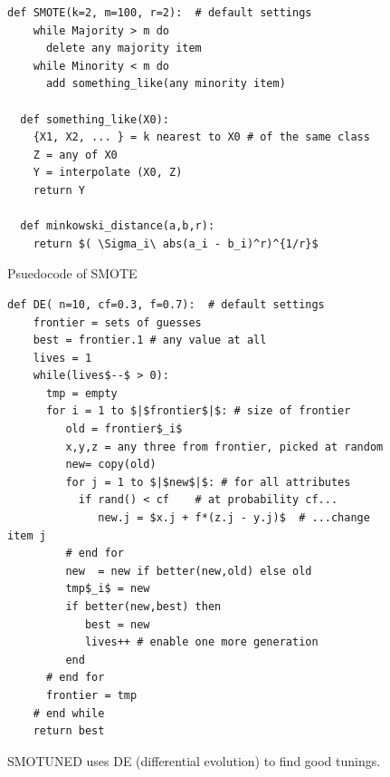 \documentclass[10pt,conference]{IEEEtran}
\theoremstyle{break}
\theoremstyle{break}
\begin{document}
 
\begin{figure}[!t]
\small
\begin{lstlisting}[mathescape,linewidth=8.2cm,frame=r,numbers=right]
  def SMOTE(k=2, m=100, r=2):  # default settings
    while Majority > m do
      delete any majority item
    while Minority < m do
      add something_like(any minority item)
      
  def something_like(X0): 
    {X1, X2, ... } = k nearest to X0 # of the same class
    Z = any of X0
    Y = interpolate (X0, Z)
    return Y
    
  def minkowski_distance(a,b,r):
    return $( \Sigma_i\ abs(a_i - b_i)^r)^{1/r}$
\end{lstlisting}
\caption{Psuedocode of SMOTE}
\label{fig:pseudocode}  
\end{figure}
\begin{figure}[!t]
\small
\begin{lstlisting}[mathescape,linewidth=8.2cm,frame=r,numbers=right]
  def DE( n=10, cf=0.3, f=0.7):  # default settings
    frontier = sets of guesses
    best = frontier.1 # any value at all
    lives = 1
    while(lives$--$ > 0): 
      tmp = empty
      for i = 1 to $|$frontier$|$: # size of frontier
         old = frontier$_i$
         x,y,z = any three from frontier, picked at random
         new= copy(old)  
         for j = 1 to $|$new$|$: # for all attributes
           if rand() < cf    # at probability cf...
              new.j = $x.j + f*(z.j - y.j)$  # ...change item j
         # end for
         new  = new if better(new,old) else old
         tmp$_i$ = new 
         if better(new,best) then
            best = new
            lives++ # enable one more generation
         end                  
      # end for
      frontier = tmp
    # end while
    return best
\end{lstlisting}
\caption{SMOTUNED uses DE (differential evolution) to find good tunings.}
\label{fig:pseudo_DE}  
\end{figure}

 
\end{document}
